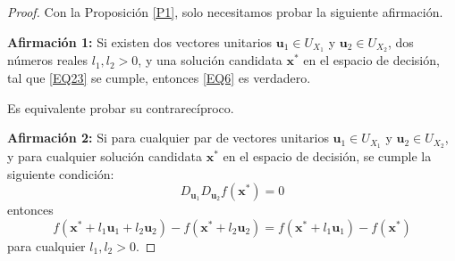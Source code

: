 \begin{proof}
Con la Proposición \ref{P1}, solo necesitamos probar la siguiente afirmación.

\textbf{Afirmación 1:} Si existen dos vectores unitarios \( \mathbf{u}_1 \in U_{X_1} \) y \( \mathbf{u}_2 \in U_{X_2} \), dos números reales \( l_1, l_2 > 0 \), y una solución candidata \( \mathbf{x}^* \) en el espacio de decisión, tal que \eqref{EQ23} se cumple, entonces \eqref{EQ6} es verdadero.

Es equivalente probar su contrarecíproco.

\textbf{Afirmación 2:} Si para cualquier par de vectores unitarios \( \mathbf{u}_1 \in U_{X_1} \) y \( \mathbf{u}_2 \in U_{X_2} \), y para cualquier solución candidata \( \mathbf{x}^* \) en el espacio de decisión, se cumple la siguiente condición:
\begin{equation}
D_{\mathbf{u}_1} D_{\mathbf{u}_2} f(\mathbf{x}^*) = 0
\label{EQ24}
\end{equation}
entonces
\begin{equation}
f(\mathbf{x}^* + l_1 \mathbf{u}_1 + l_2 \mathbf{u}_2) - f(\mathbf{x}^* + l_2 \mathbf{u}_2) = f(\mathbf{x}^* + l_1 \mathbf{u}_1) - f(\mathbf{x}^*)
\label{EQ25}
\end{equation}
para cualquier \( l_1, l_2 > 0 \).


\end{proof}
